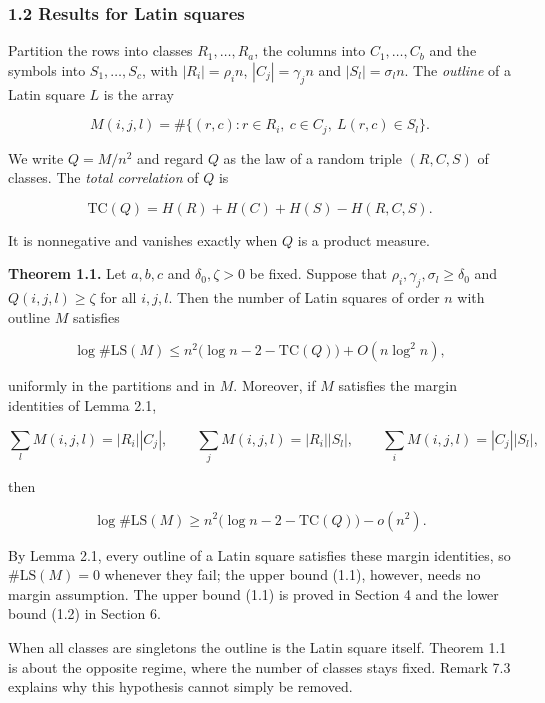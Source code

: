 \documentclass[english,11pt,a4paper]{article}
\begin{document}
\subsubsection{1.2 Results for Latin squares}\label{results-for-latin-squares}

Partition the rows into classes \(R_1,\dots,R_a\), the columns into \(C_1,\dots,C_b\) and the symbols into \(S_1,\dots,S_c\), with \(|R_i|=\rho_i n\), \(|C_j|=\gamma_j n\) and \(|S_l|=\sigma_l n\). The \emph{outline} of a Latin square \(L\) is the array

\nopagebreak[4]
\[M(i,j,l)=\#\{(r,c): r\in R_i,\ c\in C_j,\ L(r,c)\in S_l\}.\]

We write \(Q=M/n^2\) and regard \(Q\) as the law of a random triple \((R,C,S)\) of classes. The \emph{total correlation} of \(Q\) is

\nopagebreak[4]
\[\mathrm{TC}(Q)=H(R)+H(C)+H(S)-H(R,C,S).\]

It is nonnegative and vanishes exactly when \(Q\) is a product measure.

\textbf{Theorem 1.1.} Let \(a,b,c\) and \(\delta_0,\zeta>0\) be fixed. Suppose that \(\rho_i,\gamma_j,\sigma_l\ge\delta_0\) and \(Q(i,j,l)\ge\zeta\) for all \(i,j,l\). Then the number of Latin squares of order \(n\) with outline \(M\) satisfies

\nopagebreak[4]
\[\log\#\mathrm{LS}(M)\le n^2\bigl(\log n-2-\mathrm{TC}(Q)\bigr)+O(n\log^2 n),\tag{1.1}\]

uniformly in the partitions and in \(M\). Moreover, if \(M\) satisfies the margin identities of Lemma 2.1,

\nopagebreak[4]
\[\sum_l M(i,j,l)=|R_i||C_j|,\qquad \sum_j M(i,j,l)=|R_i||S_l|,\qquad \sum_i M(i,j,l)=|C_j||S_l|,\]

then

\nopagebreak[4]
\[\log\#\mathrm{LS}(M)\ge n^2\bigl(\log n-2-\mathrm{TC}(Q)\bigr)-o(n^2).\tag{1.2}\]

By Lemma 2.1, every outline of a Latin square satisfies these margin identities, so \(\#\mathrm{LS}(M)=0\) whenever they fail; the upper bound (1.1), however, needs no margin assumption. The upper bound (1.1) is proved in Section 4 and the lower bound (1.2) in Section 6.

When all classes are singletons the outline is the Latin square itself. Theorem 1.1 is about the opposite regime, where the number of classes stays fixed. Remark 7.3 explains why this hypothesis cannot simply be removed.
\end{document}
